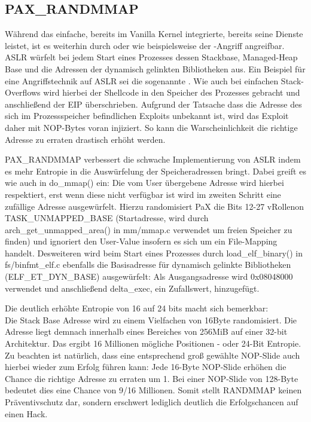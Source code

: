 \subsection{PAX\_RANDMMAP}
\label{subsec:PAX_RANDMMAP}
Während das einfache, bereits im Vanilla Kernel integrierte,  bereits seine Dienste leistet, ist es weiterhin durch  oder  wie beispielsweise der -Angriff angreifbar. ASLR würfelt bei jedem Start eines Prozesses dessen Stackbase, Managed-Heap Base und die Adressen der dynamisch gelinkten Bibliotheken aus. Ein Beispiel für eine Angriffstechnik auf ASLR sei die sogenannte . Wie auch bei einfachen Stack-Overflows wird hierbei der Shellcode in den Speicher des Prozesses gebracht und anschließend der EIP überschrieben. Aufgrund der Tatsache dass die Adresse des sich im Prozessspeicher befindlichen Exploits unbekannt ist, wird das Exploit daher mit NOP-Bytes voran injiziert. So kann die Warscheinlichkeit die richtige Adresse zu erraten drastisch erhöht werden.

PAX\_RANDMMAP verbessert die schwache Implementierung von ASLR indem es mehr Entropie in die Auswürfelung der Speicheradressen bringt. Dabei greift es wie auch  in do\_mmap() ein:
Die vom User übergebene Adresse wird hierbei respektiert, erst wenn diese nicht verfügbar ist wird im zweiten Schritt eine zufällige Adresse ausgewürfelt. Hierzu randomisiert PaX die Bits 12-27 vRollenon TASK\_UNMAPPED\_BASE (Startadresse, wird durch arch\_get\_unmapped\_area() in mm/mmap.c verwendet um freien Speicher zu finden) und ignoriert den User-Value insofern es sich um ein File-Mapping handelt. Desweiteren wird beim Start eines Prozesses durch load\_elf\_binary() in fs/binfmt\_elf.c ebenfalls die Basisadresse für dynamisch gelinkte Bibliotheken (ELF\_ET\_DYN\_BASE) ausgewürfelt: Als Ausgangsadresse wird 0x08048000 verwendet und anschließend delta\_exec, ein Zufallswert, hinzugefügt.

\newpage
Die deutlich erhöhte Entropie von 16 auf 24 bits macht sich bemerkbar:\\
Die Stack Base Adresse wird zu einem Vielfachen von 16Byte randomisiert. Die Adresse liegt demnach innerhalb eines Bereiches von 256MiB auf einer 32-bit Architektur. Das ergibt 16 Millionen mögliche Positionen - oder 24-Bit Entropie. Zu beachten ist natürlich, dass eine entsprechend groß gewählte NOP-Slide auch hierbei wieder zum Erfolg führen kann: Jede 16-Byte NOP-Slide erhöhen die Chance die richtige Adresse zu erraten um 1. Bei einer NOP-Slide von 128-Byte bedeutet dies eine Chance von 9/16 Millionen.
Somit stellt RANDMMAP keinen Präventivschutz dar, sondern erschwert lediglich deutlich die Erfolgschancen auf einen Hack.

